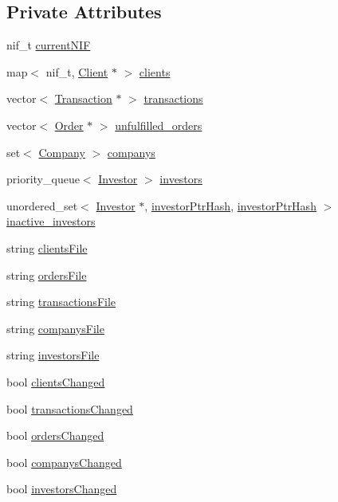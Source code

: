 \subsection*{Private Attributes}
\begin{DoxyCompactItemize}
\item 
nif\+\_\+t \hyperlink{class_market_a3ff92b5217f5283b80f7da79d4d42500}{current\+N\+IF}
\item 
map$<$ nif\+\_\+t, \hyperlink{class_client}{Client} $\ast$ $>$ \hyperlink{class_market_a78e8cb9fd9f208c1ea819916e4594095}{clients}
\item 
vector$<$ \hyperlink{class_transaction}{Transaction} $\ast$ $>$ \hyperlink{class_market_a02c9e3833ee8a5a4560c0fc4a4b0f3a6}{transactions}
\item 
vector$<$ \hyperlink{class_order}{Order} $\ast$ $>$ \hyperlink{class_market_a01f48cd85dcba282896c52c86f282e62}{unfulfilled\+\_\+orders}
\item 
set$<$ \hyperlink{class_company}{Company} $>$ \hyperlink{class_market_a66e915108e283c8fe899064868c2386d}{companys}
\item 
priority\+\_\+queue$<$ \hyperlink{class_investor}{Investor} $>$ \hyperlink{class_market_afae1c420d61b02ec9130e80f2a85404b}{investors}
\item 
unordered\+\_\+set$<$ \hyperlink{class_investor}{Investor} $\ast$, \hyperlink{structinvestor_ptr_hash}{investor\+Ptr\+Hash}, \hyperlink{structinvestor_ptr_hash}{investor\+Ptr\+Hash} $>$ \hyperlink{class_market_a3dcdf435fbc6b0d509f047842e22c618}{inactive\+\_\+investors}
\item 
string \hyperlink{class_market_aaf295ab39cf11a5af7e3decce4938b88}{clients\+File}
\item 
string \hyperlink{class_market_a5666bce554a9c1b1df1b93638fb8d803}{orders\+File}
\item 
string \hyperlink{class_market_ae4a312dda682ea7048214886b513b8e8}{transactions\+File}
\item 
string \hyperlink{class_market_a5c33b787200b05b9e680eed5ec055fc7}{companys\+File}
\item 
string \hyperlink{class_market_a50191ccb3c24b3eaf5ad12c7f07959fa}{investors\+File}
\item 
bool \hyperlink{class_market_a6028725209e63a9f70a6b59c10d2bfbb}{clients\+Changed}
\item 
bool \hyperlink{class_market_a13b574ab508839b47311dd5ad6c7e440}{transactions\+Changed}
\item 
bool \hyperlink{class_market_a3ce6aa571b7ee3be3a9517110828421f}{orders\+Changed}
\item 
bool \hyperlink{class_market_a1c96ae6c45e556eb7fb6e52ec669d1e8}{companys\+Changed}
\item 
bool \hyperlink{class_market_a0b60788b5f378833909924c74d4b23ef}{investors\+Changed}
\end{DoxyCompactItemize}
